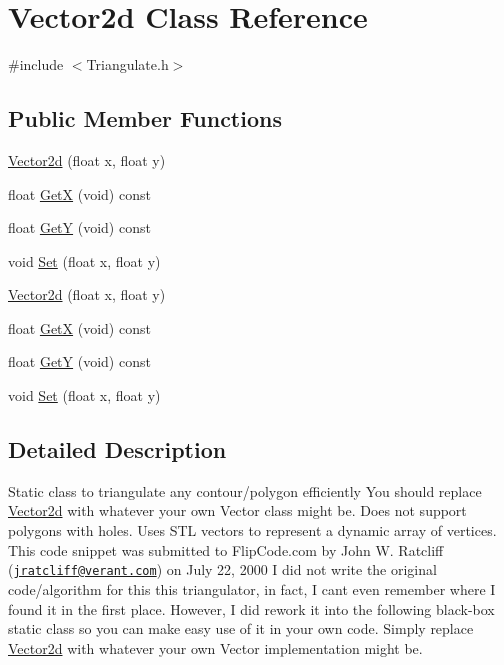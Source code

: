 \hypertarget{class_vector2d}{}\section{Vector2d Class Reference}
\label{class_vector2d}


{\ttfamily \#include $<$Triangulate.\+h$>$}

\subsection*{Public Member Functions}
\begin{DoxyCompactItemize}
\item 
\hyperlink{class_vector2d_ab8c057e74fb250442e3114ef597ca49f}{Vector2d} (float x, float y)
\item 
float \hyperlink{class_vector2d_af7e3481fd89003bfdd2755e8537dcebc}{Get\+X} (void) const 
\item 
float \hyperlink{class_vector2d_a192288b009a6b11ae8a01e87104771da}{Get\+Y} (void) const 
\item 
void \hyperlink{class_vector2d_a9b8d70f0ba6f785652ea64d5c7bf82c1}{Set} (float x, float y)
\item 
\hyperlink{class_vector2d_ab8c057e74fb250442e3114ef597ca49f}{Vector2d} (float x, float y)
\item 
float \hyperlink{class_vector2d_af7e3481fd89003bfdd2755e8537dcebc}{Get\+X} (void) const 
\item 
float \hyperlink{class_vector2d_a192288b009a6b11ae8a01e87104771da}{Get\+Y} (void) const 
\item 
void \hyperlink{class_vector2d_a9b8d70f0ba6f785652ea64d5c7bf82c1}{Set} (float x, float y)
\end{DoxyCompactItemize}


\subsection{Detailed Description}
Static class to triangulate any contour/polygon efficiently You should replace \hyperlink{class_vector2d}{Vector2d} with whatever your own Vector class might be. Does not support polygons with holes. Uses S\+T\+L vectors to represent a dynamic array of vertices. This code snippet was submitted to Flip\+Code.\+com by John W. Ratcliff (\href{mailto:jratcliff@verant.com}{\tt jratcliff@verant.\+com}) on July 22, 2000 I did not write the original code/algorithm for this this triangulator, in fact, I can\textquotesingle{}t even remember where I found it in the first place. However, I did rework it into the following black-\/box static class so you can make easy use of it in your own code. Simply replace \hyperlink{class_vector2d}{Vector2d} with whatever your own Vector implementation might be. 

